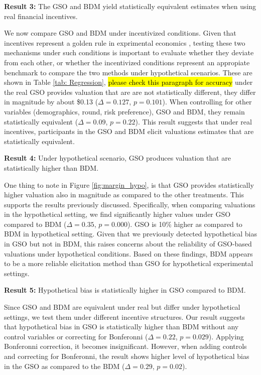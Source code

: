 \documentclass[12pt]{article}
\begin{document}
\vspace{0.5cm}



\textbf{Result 3:} The GSO and BDM yield statistically equivalent estimates when using real financial incentives. 

We now compare GSO and BDM under incentivized conditions. Given that incentives represent a golden rule in exprimental economics \citep{smith_experimental_1976}, testing these two mechanisms under such conditions is important to evaluate whether they deviate from each other, or whether the incentivized conditions represent an appropiate benchmark to compare the two methods under hypothetical scenarios. These are shown in Table \ref{tab: Regression}, \hl{please check this paragraph for accuracy} under the real GSO provides valuation that are are not statistically different, they differ in magnitude by about \$0.13 (\(\Delta = 0.127\), \(p = 0.101\)). When controlling for other variables (demographics, round, risk preference), GSO and BDM, they remain statistically equivalent (\(\Delta = 0.09\), \(p = 0.22\)). This result suggests that under real incentives, participants in the GSO and BDM elicit valuations estimates that are statistically equivalent.

\vspace{0.5cm}

\textbf{Result 4:} Under hypothetical scenario, GSO produces valuation that are statistically higher than BDM.

One thing to note in Figure \ref{fig:margin_hypo}, is that GSO provides statistically higher valuation also in magnitude as compared to the other treatments. This supports the results previously discussed. Specifically, when comparing valuations in the hypothetical setting, we find significantly higher values under GSO compared to BDM  (\(\Delta = 0.35\), \(p = 0.000\)). GSO  is 10\% higher as compared to BDM in hypothetical setting. Given that we previously detected hypothetical bias in GSO but not in BDM, this raises concerns about the reliability of GSO-based valuations under hypothetical conditions. Based on these findings, BDM appears to be a more reliable elicitation method than GSO for hypothetical experimental settings.

\vspace{0.5cm}

\textbf{Result 5:} Hypothetical bias is statistically higher in GSO compared to BDM.

Since GSO and BDM  are equivalent under real but differ under hypothetical settings, we test them under different incentive structures. Our result suggests that hypothetical bias in GSO is statistically higher than BDM without any control variables or correcting for Bonferonni (\(\Delta = 0.22\), \(p = 0.029\)). Applying Bonferonni correction, it becomes insignificant. However, when adding controls and correcting for Bonferonni, the result shows higher level of hypothetical bias in the GSO as compared to the BDM (\(\Delta = 0.29\), \(p = 0.02\)).
\end{document}

